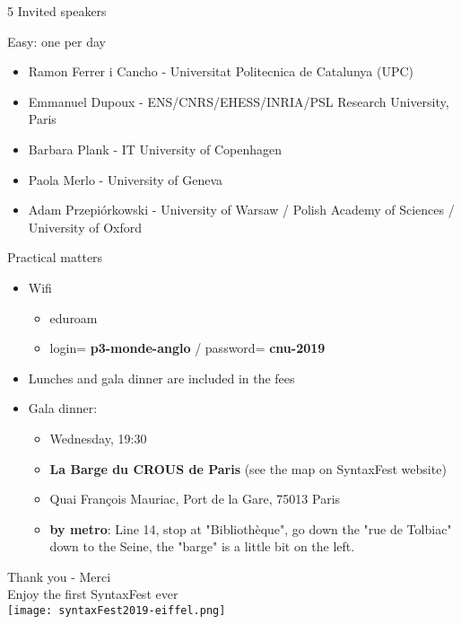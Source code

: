 \documentclass{beamer}
\begin{document}
\begin{frame}{5 Invited speakers}

Easy: one per day
\begin{itemize}

\item    Ramon Ferrer i Cancho - Universitat Politecnica de Catalunya (UPC)
\item     Emmanuel Dupoux - ENS/CNRS/EHESS/INRIA/PSL Research University, Paris
\item    Barbara Plank - IT University of Copenhagen
\item    Paola Merlo - University of Geneva
\item     Adam Przepiórkowski - University of Warsaw / Polish Academy of Sciences / University of Oxford

\end{itemize}

\end{frame}

\begin{frame}{Practical matters}
\begin{itemize}
\item Wifi
\begin{itemize}
\item eduroam
\item login= {\bf p3-monde-anglo} / password= {\bf cnu-2019}
\end{itemize}

\item Lunches and gala dinner are included in the fees
\item Gala dinner:
\begin{itemize}
\item Wednesday, 19:30
\item {\bf La Barge du CROUS de Paris} (see the map on SyntaxFest website)
\item Quai François Mauriac, Port de la Gare, 75013 Paris
\item {\bf by metro}: Line 14, stop at "Bibliothèque", go down the "rue de Tolbiac" down to the Seine, the "barge" is a little bit on the left. 
\end{itemize}
\end{itemize}
\end{frame}



\begin{frame}{}
\begin{center}
Thank you - Merci\\
\vspace{1em}
Enjoy the first SyntaxFest ever\\
\vspace{1em}
\texttt{[image: syntaxFest2019-eiffel.png]}%
\end{center}


\end{frame}
\end{document}
